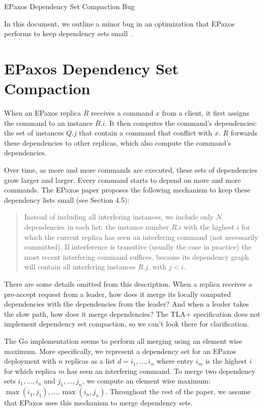 \documentclass{mwhittaker}
\begin{document}
\begin{center}
  \Huge EPaxos Dependency Set Compaction Bug
\end{center}
In this document, we outline a minor bug in an optimization that EPaxos
performs to keep dependency sets small~\cite{moraru2013there, moraru2013proof}.

\section{EPaxos Dependency Set Compaction}
When an EPaxos replica $R$ receives a command $x$ from a client, it first
assigns the command to an instance $R.i$. It then computes the command's
dependencies: the set of instances $Q.j$ that contain a command that conflict
with $x$. $R$ forwards these dependencies to other replicas, which also compute
the command's dependencies.

Over time, as more and more commands are executed, these sets of dependencies
grow larger and larger. Every command starts to depend on more and more
commands. The EPaxos paper proposes the following mechanism to keep these
dependency lists small (see Section 4.5):

\begin{quote}
  Instead of including all interfering instances, we include only $N$
  dependencies in each list: the instance number $R.i$ with the highest $i$ for
  which the current replica has seen an interfering command (not necessarily
  committed). If interference is transitive (usually the case in practice) the
  most recent interfering command suffices, because its dependency graph will
  contain all interfering instances $R.j$, with $j < i$.
\end{quote}

There are some details omitted from this description. When a replica receives a
pre-accept request from a leader, how does it merge its locally computed
dependencies with the dependencies from the leader? And when a leader takes the
slow path, how does it merge dependencies? The TLA+ specification does not
implement dependency set compaction, so we can't look there for clarification.

The Go implementation seems to perform all merging using an element wise
maximum. More specifically, we represent a dependency set for an EPaxos
deployment with $n$ replicas as a list $d = i_1, \ldots, i_n$ where entry $i_m$
is the highest $i$ for which replica $m$ has seen an interfering command. To
merge two dependency sets $i_1, \ldots, i_n$ and $j_1, \ldots, j_n$, we compute
an element wise maximum: $\max(i_1, j_1), \ldots, \max(i_n, j_n)$.  Throughout
the rest of the paper, we assume that EPaxos uses this mechanism to merge
dependency sets.
\end{document}

